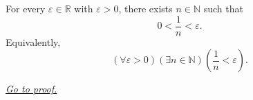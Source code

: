 \begin{corollary}
\label{cor:archimedean-reciprocal-form}
For every $\varepsilon\in\mathbb{R}$ with $\varepsilon>0$, there exists
$n\in\mathbb{N}$ such that
\[
  0<\frac{1}{n}<\varepsilon.
\]
Equivalently,
\[
  (\forall\varepsilon>0)(\exists n\in\mathbb{N})\left(\frac{1}{n}<\varepsilon\right).
\]

\smallskip
\noindent
\hyperref[prf:archimedean-reciprocal-form]{\textit{Go to proof.}}
\end{corollary}
